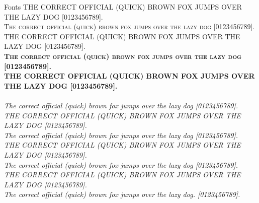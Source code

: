 \documentclass[12pt]{PalisadesLakesArticle}
\begin{document}
\begin{plSection}{Fonts}
{THE CORRECT OFFICIAL (QUICK) BROWN FOX JUMPS OVER THE LAZY DOG [0123456789].\\ }
\textsc{\textmd{
The correct official (quick) brown fox jumps over the lazy dog [0123456789].\\
THE CORRECT OFFICIAL (QUICK) BROWN FOX JUMPS OVER THE LAZY DOG [0123456789].\\ }}
\textsc{}
\textsc{\textbf{
The correct official (quick) brown fox jumps over the lazy dog [0123456789].\\
THE CORRECT OFFICIAL (QUICK) BROWN FOX JUMPS OVER THE LAZY DOG [0123456789].\\ }}
\textsc{}
 \\
\textit{
The correct official (quick) brown fox jumps over the lazy dog [0123456789].\\
THE CORRECT OFFICIAL (QUICK) BROWN FOX JUMPS OVER THE LAZY DOG [0123456789].\\ }
\textsl{
The correct official (quick) brown fox jumps over the lazy dog [0123456789].\\
THE CORRECT OFFICIAL (QUICK) BROWN FOX JUMPS OVER THE LAZY DOG [0123456789].\\ }
\textsl{}
\textsl{}
\textsl{
The correct official (quick) brown fox jumps over the lazy dog [0123456789].\\
THE CORRECT OFFICIAL (QUICK) BROWN FOX JUMPS OVER THE LAZY DOG [0123456789].\\ }
\textsl{\textmd{
The correct official (quick) brown fox jumps over the lazy dog. [0123456789].\\
}}
\end{plSection}
\end{document}
